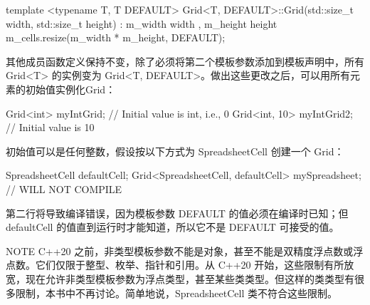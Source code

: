\begin{cpp}
template <typename T, T DEFAULT>
Grid<T, DEFAULT>::Grid(std::size_t width, std::size_t height)
    : m_width { width }, m_height { height }
{
    m_cells.resize(m_width * m_height, DEFAULT);
}
\end{cpp}

其他成员函数定义保持不变，除了必须将第二个模板参数添加到模板声明中，所有 Grid<T> 的实例变为 Grid<T, DEFAULT>。做出这些更改之后，可以用所有元素的初始值实例化Grid：

\begin{cpp}
Grid<int> myIntGrid; // Initial value is int{}, i.e., 0
Grid<int, 10> myIntGrid2; // Initial value is 10
\end{cpp}

初始值可以是任何整数，假设按以下方式为 SpreadsheetCell 创建一个 Grid：

\begin{cpp}
SpreadsheetCell defaultCell;
Grid<SpreadsheetCell, defaultCell> mySpreadsheet; // WILL NOT COMPILE
\end{cpp}

第二行将导致编译错误，因为模板参数 DEFAULT 的值必须在编译时已知；但defaultCell 的值直到运行时才能知道，所以它不是 DEFAULT 可接受的值。

\begin{myNotic}{NOTE}
C++20 之前，非类型模板参数不能是对象，甚至不能是双精度浮点数或浮点数。它们仅限于整型、枚举、指针和引用。从 C++20 开始，这些限制有所放宽，现在允许非类型模板参数为浮点类型，甚至某些类类型。但这样的类类型有很多限制，本书中不再讨论。简单地说，SpreadsheetCell 类不符合这些限制。
\end{myNotic}





























